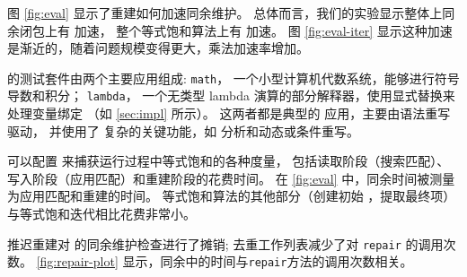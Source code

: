 图 \autoref{fig:eval} 显示了重建如何加速同余维护。
总体而言，我们的实验显示整体上同余闭包上有 \CongrSpeedup 加速，
  整个等式饱和算法上有 \TotalSpeedup 加速。
图 \autoref{fig:eval-iter} 显示这种加速是渐近的，随着问题规模变得更大，乘法加速率增加。


\egg 的测试套件由两个主要应用组成:
\texttt{math}，
一个小型计算机代数系统，能够进行符号导数和积分；
\texttt{lambda}，
  一个无类型 lambda 演算的部分解释器，使用显式替换来处理变量绑定
  （如 \autoref{sec:impl} 所示）。
这两者都是典型的 \egg 应用，主要由语法重写驱动，
  并使用了 \egg 复杂的关键功能，如 \eclass 分析和动态或条件重写。


可以配置 \egg 来捕获运行过程中等式饱和的各种度量，
  包括读取阶段（搜索匹配）、写入阶段（应用匹配）和重建阶段的花费时间。
在 \autoref{fig:eval} 中，同余时间被测量为应用匹配和重建的时间。  %
等式饱和算法的其他部分（创建初始 \egraph，提取最终项）与等式饱和迭代相比花费非常小。


推迟重建对 \eclasses 的同余维护检查进行了摊销;
  去重工作列表减少了对 \texttt{repair} 的调用次数。
\autoref{fig:repair-plot} 显示，同余中的时间与\texttt{repair}方法的调用次数相关。


